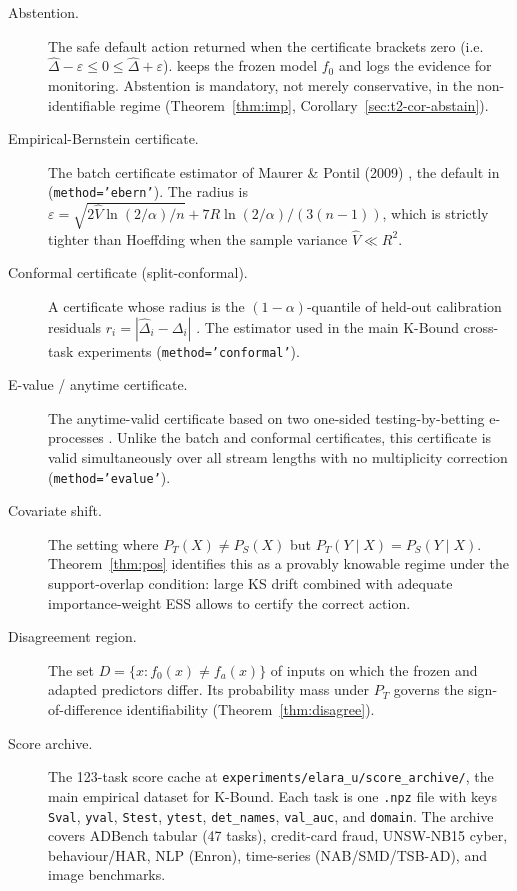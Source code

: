 \begin{description}
\item[Abstention.]
  The safe default action returned when the certificate brackets zero (i.e.\
  $\widehat\Delta - \varepsilon \leq 0 \leq \widehat\Delta + \varepsilon$).
  \KGA{} keeps the frozen model $f_0$ and logs the evidence for monitoring.
  Abstention is mandatory, not merely conservative, in the non-identifiable
  regime (Theorem~\ref{thm:imp}, Corollary~\ref{sec:t2-cor-abstain}).

\item[Empirical-Bernstein certificate.]
  The batch certificate estimator of Maurer \& Pontil (2009)
  \cite{maurer2009empirical}, the default in \KGA{} (\texttt{method='ebern'}).
  The radius is $\varepsilon = \sqrt{2\widehat{V}\ln(2/\alpha)/n} +
  7R\ln(2/\alpha)/(3(n-1))$, which is strictly tighter than Hoeffding when the
  sample variance $\widehat{V} \ll R^2$.

\item[Conformal certificate (split-conformal).]
  A certificate whose radius is the $(1-\alpha)$-quantile of held-out
  calibration residuals $r_i = |\widehat\Delta_i - \Delta_i|$
  \cite{vovk2005algorithmic,angelopoulos2023conformal}.  The estimator used in
  the main K-Bound cross-task experiments (\texttt{method='conformal'}).

\item[E-value / anytime certificate.]
  The anytime-valid certificate based on two one-sided testing-by-betting
  e-processes \cite{ville1939etude,waudbysmith2024betting}.  Unlike the batch
  and conformal certificates, this certificate is valid simultaneously over all
  stream lengths with no multiplicity correction (\texttt{method='evalue'}).

\item[Covariate shift.]
  The setting where $P_T(X) \neq P_S(X)$ but $P_T(Y \mid X) = P_S(Y \mid X)$.
  Theorem~\ref{thm:pos} identifies this as a provably knowable regime under the
  support-overlap condition: large KS drift combined with adequate importance-weight
  ESS allows \KGA{} to certify the correct action.

\item[Disagreement region.]
  The set $D = \{x : f_0(x) \neq f_a(x)\}$ of inputs on which the frozen and
  adapted predictors differ.  Its probability mass under $P_T$ governs the
  sign-of-difference identifiability (Theorem~\ref{thm:disagree}).

\item[Score archive.]
  The 123-task score cache at \texttt{experiments/elara\_u/score\_archive/},
  the main empirical dataset for K-Bound.  Each task is one \texttt{.npz} file
  with keys \texttt{Sval}, \texttt{yval}, \texttt{Stest}, \texttt{ytest},
  \texttt{det\_names}, \texttt{val\_auc}, and \texttt{domain}.  The archive
  covers ADBench tabular (47 tasks), credit-card fraud, UNSW-NB15 cyber,
  behaviour/HAR, NLP (Enron), time-series (NAB/SMD/TSB-AD), and image benchmarks.


\end{description}
